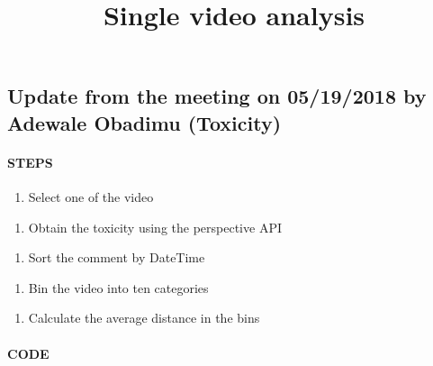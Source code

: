 \documentclass[11pt]{article}
\title{Single video analysis}
\providecommand{\tightlist}{%
      \setlength{\itemsep}{0pt}\setlength{\parskip}{0pt}}
\begin{document}
    
    
    \maketitle
    
    

    
    \subsection{Update from the meeting on 05/19/2018 by Adewale Obadimu
(Toxicity)}\label{update-from-the-meeting-on-05192018-by-adewale-obadimu-toxicity}

    \paragraph{STEPS}\label{steps}

    \begin{enumerate}
\def\labelenumi{\arabic{enumi})}
\tightlist
\item
  Select one of the video
\end{enumerate}

    \begin{enumerate}
\def\labelenumi{\arabic{enumi})}
\setcounter{enumi}{1}
\tightlist
\item
  Obtain the toxicity using the perspective API
\end{enumerate}

    \begin{enumerate}
\def\labelenumi{\arabic{enumi})}
\setcounter{enumi}{2}
\tightlist
\item
  Sort the comment by DateTime
\end{enumerate}

    \begin{enumerate}
\def\labelenumi{\arabic{enumi})}
\setcounter{enumi}{3}
\tightlist
\item
  Bin the video into ten categories
\end{enumerate}

    \begin{enumerate}
\def\labelenumi{\arabic{enumi})}
\setcounter{enumi}{4}
\tightlist
\item
  Calculate the average distance in the bins
\end{enumerate}

    \paragraph{CODE}\label{code}
\end{document}
